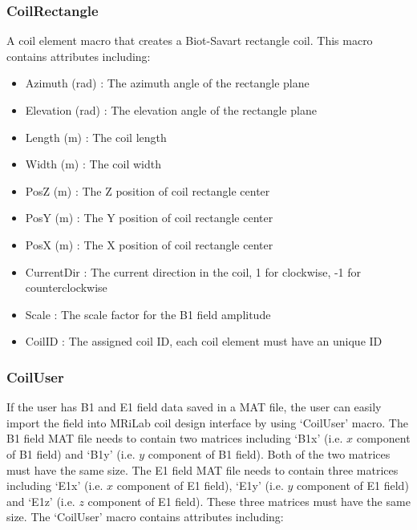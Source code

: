 \documentclass{book}%
\begin{document}
\subsubsection{CoilRectangle}

A coil element macro that creates a Biot-Savart rectangle coil. This macro contains attributes including:

\begin{itemize}
	\item Azimuth (rad) : The azimuth angle of the rectangle plane
	\item Elevation (rad) : The elevation angle of the rectangle plane
	\item Length (m) : The coil length
	\item Width (m) : The coil width
	\item PosZ (m) : The Z position of coil rectangle center
  \item PosY (m) : The Y position of coil rectangle center
	\item PosX (m) : The X position of coil rectangle center
	\item CurrentDir : The current direction in the coil, 1 for clockwise, -1 for counterclockwise
	\item Scale : The scale factor for the B1 field amplitude
	\item CoilID : The assigned coil ID, each coil element must have an unique ID
\end{itemize}

\subsubsection{CoilUser}

If the user has B1 and E1 field data saved in a MAT file, the user can easily import the field into MRiLab coil design interface by using `CoilUser' macro. The B1 field MAT file needs to contain two matrices including `B1x' (i.e. $x$ component of B1 field) and `B1y' (i.e. $y$ component of B1 field). Both of the two matrices must have the same size. The E1 field MAT file needs to contain three matrices including `E1x' (i.e. $x$ component of E1 field), `E1y' (i.e. $y$ component of E1 field) and `E1z' (i.e. $z$ component of E1 field). These three matrices must have the same size. The `CoilUser' macro contains attributes including:
\end{document}
